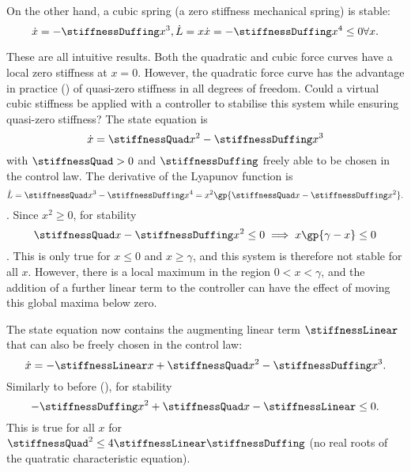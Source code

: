 On the other hand, a cubic spring (a zero stiffness mechanical spring)
is stable:
\begin{dmath}
  \dot x = -\stiffnessDuffing x^3 , \\
  \dot L = x \dot x = -\stiffnessDuffing x^4 \le 0 \forall x .
\end{dmath}


These are all intuitive results. Both the quadratic and cubic force
curves have a local zero stiffness at $x=0$. However, the quadratic
force curve has the advantage in practice () of
quasi-zero stiffness in all degrees of freedom. Could a virtual cubic
stiffness be applied with a controller to stabilise this system while
ensuring quasi-zero stiffness? The state equation is
\begin{dmath}
  \dot x = \stiffnessQuad x^2 -\stiffnessDuffing x^3
\end{dmath}
with $\stiffnessQuad > 0$ and $\stiffnessDuffing$ freely able to be
chosen in the control law. The derivative of the Lyapunov function is
\begin{dmath}
  \dot L  = \stiffnessQuad x^3 -\stiffnessDuffing x^4
          = x^2 \gp{\stiffnessQuad x -\stiffnessDuffing x^2} .
\end{dmath}.
Since $x^2\ge0$, for stability
\begin{dmath}[compact]
  \stiffnessQuad x -\stiffnessDuffing x^2 \le 0
  \implies x\gp{\gamma-x} \le 0
\end{dmath}.
This is only true for $x\le0$ and $x\ge\gamma$, and this system is
therefore not stable for all $x$. However, there is a local maximum in
the region $0<x<\gamma$, and the addition of a further linear term to
the controller can have the effect of moving this global maxima below zero.

The state equation now contains the augmenting linear term
$\stiffnessLinear$ that can also be freely chosen in the control law:
\begin{dmath}
  \dot x = -\stiffnessLinear x + \stiffnessQuad x^2 - \stiffnessDuffing x^3.
\end{dmath}
Similarly to before (), for stability
\begin{dmath}
  -\stiffnessDuffing x^2 + \stiffnessQuad x - \stiffnessLinear \le 0.
\end{dmath}
This is true for all $x$ for $\stiffnessQuad^2 \le
4\stiffnessLinear\stiffnessDuffing$ (no real roots of the quatratic
characteristic equation).

